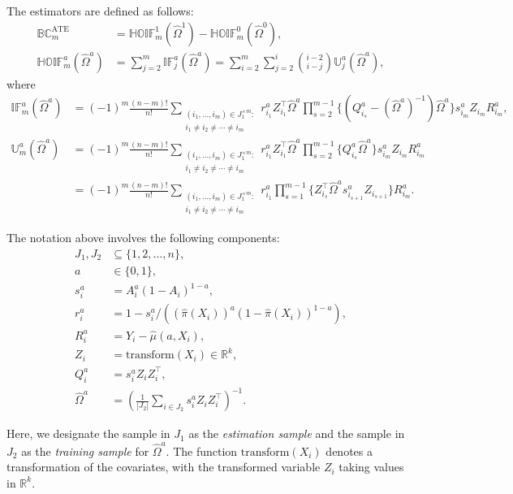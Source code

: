 \documentclass[12pt]{article}
\begin{document}
The estimators are defined as follows:
\begin{align*}
  \mathbb{BC}^{\mathrm{ATE}}_m &= \mathbb{HOIF}^1_m(\hat{\Omega}^1) - \mathbb{HOIF}^0_m(\hat{\Omega}^0), \\
  \mathbb{HOIF}^a_m(\hat{\Omega}^a) &= \sum_{j=2}^m \mathbb{IF}^a_j(\hat{\Omega}^a) = \sum_{i=2}^m \sum_{j=2}^{i} \binom{i-2}{i-j} \mathbb{U}^a_j(\hat{\Omega}^a),
\end{align*}
where
\begin{align*}
    \mathbb{IF}^a_m(\hat{\Omega}^a) &= (-1)^m \frac{(n-m)!}{n!} \sum_{\substack{(i_1, \ldots, i_m) \in J_1^{\times m} : \\ i_1 \neq i_2 \neq \cdots \neq i_m}} r^a_{i_1} Z_{i_1}^\top \hat{\Omega}^a \prod_{s = 2}^{m-1} \{(Q^a_{i_s} - (\hat{\Omega}^a)^{-1}) \hat{\Omega}^a\} s^a_{i_m} Z_{i_m} R^a_{i_m}, \\
  \mathbb{U}^a_m(\hat{\Omega}^a) &= (-1)^m \frac{(n-m)!}{n!} \sum_{\substack{(i_1, \ldots, i_m) \in J_1^{\times m} : \\ i_1 \neq i_2 \neq \cdots \neq i_m}} r^a_{i_1} Z_{i_1}^\top \hat{\Omega}^a \prod_{s = 2}^{m-1} \{Q^a_{i_s} \hat{\Omega}^a\} s^a_{i_m} Z_{i_m} R^a_{i_m} \\
  &= (-1)^m \frac{(n-m)!}{n!} \sum_{\substack{(i_1, \ldots, i_m) \in J_1^{\times m} : \\ i_1 \neq i_2 \neq \cdots \neq i_m}} r^a_{i_1} \prod_{s = 1}^{m-1} \{Z_{i_s}^\top \hat{\Omega}^a s^a_{i_{s+1}} Z_{i_{s+1}}\} R^a_{i_m}.
\end{align*}

The notation above involves the following components:
\begin{align*}
  J_1, J_2 & \subseteq \{1,2,\ldots,n\}, \\
  a &\in \{0,1\}, \\
  s^a_{i} &= A_i^a (1-A_i)^{1-a}, \\
  r^a_{i} &= 1 - s^a_i / \left((\hat{\pi}(X_i))^a (1 - \hat{\pi}(X_i))^{1-a}\right), \\
  R^a_{i} &= Y_i - \hat{\mu}(a,X_i), \\
  Z_i &= \text{transform}(X_i) \in \mathbb{R}^k, \\
   Q^a_{i} & =  s^a_{i} Z_i Z_i^{\top} , \\
  \hat{\Omega}^a &= \left(\frac{1}{|J_2|} \sum_{i \in J_2} s^a_{i} Z_i Z_i^\top\right)^{-1}.
\end{align*}

Here, we designate the sample in $J_1$ as the \textit{estimation sample} and the sample in $J_2$ as the \textit{training sample} for $\hat{\Omega}^a$. The function $\text{transform}(X_i)$ denotes a transformation of the covariates, with the transformed variable $Z_i$ taking values in $\mathbb{R}^{k}$.
\end{document}
